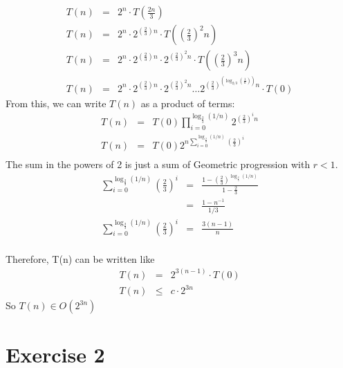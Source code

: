 \documentclass[a4paper,12pt]{article} %
\begin{document}
\begin{eqnarray*}
    T(n) &=& 2^n \cdot T \left(\frac{2n}{3}\right) \\
    T(n) &=& 2^n \cdot 2^{\left(\frac{2}{3}\right) n} \cdot T\left(\left(\frac{2}{3}\right)^2 n\right)\\
    T(n) &=& 2^n \cdot 2^{\left(\frac{2}{3}\right)n} \cdot 2^{\left(\frac{2}{3}\right)^2 n }\cdot T\left(\left(\frac{2}{3}\right)^3 n\right)\\
    T(n) &=& 2^n \cdot 2^{\left(\frac{2}{3}\right)n} \cdot 2^{\left(\frac{2}{3}\right)^2 n } \dots  2^{\left(\frac{2}{3}\right)^{\left(\log_{2/3}\left(\frac{1}{n}\right)\right)} n}\cdot T(0)
\end{eqnarray*}
From this, we can write $T(n)$ as a product of terms:
\begin{eqnarray*}
    T(n) &=& T(0)\prod_{i=0}^{\log_{\frac{2}{3}}(1/n)}2^{\left(\frac{2}{3}\right)^i n}\\
    T(n) &=& T(0)2^{n\sum_{i = 0}^{\log_{\frac{2}{3}}(1/n)}\left(\frac{2}{3}\right)^i}\\
\end{eqnarray*}
The sum in the powers of 2 is just a sum of Geometric progression with $r<1$.\\
\begin{eqnarray*}
    \sum_{i = 0}^{\log_{\frac{2}{3}}(1/n)}\left(\frac{2}{3}\right)^i &=& \frac{1 - \left(\frac{2}{3}\right)^{\log_{\frac{2}{3}}(1/n)}}{1 - \frac{2}{3}}\\
    &=& \frac{1 - n^{-1}}{1/3}\\
    \sum_{i = 0}^{\log_{\frac{2}{3}}(1/n)}\left(\frac{2}{3}\right)^i &=& \frac{3(n-1)}{n}\\
\end{eqnarray*}

Therefore, T(n) can be written like \\
\begin{eqnarray*}
    T(n) &=& 2^{3(n-1)}\cdot T(0) \\
    T(n) &\leq& c \cdot 2^{3n}
\end{eqnarray*}
So $T(n) \in O(2^{3n})$

\section*{Exercise 2}
\end{document}
